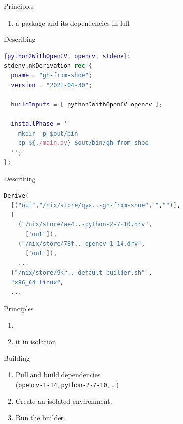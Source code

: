 \documentclass[aspectratio=169]{beamer}
\newcommand{\couleur}[2]{{\color{#1}{#2}}}
\begin{document}
\begin{frame}
    \begin{block}{Principles}
        \begin{enumerate}
            \item<2-> \couleur{blue-portage}{Describe} a package and its
                dependencies in full
         \end{enumerate}
    \end{block}
\end{frame}

\begin{frame}[fragile]{Describing}
\begin{lstlisting}[language=Nix,title={gh-from-shoe/default.nix}]
{python2WithOpenCV, opencv, stdenv}:
stdenv.mkDerivation rec {
  pname = "gh-from-shoe";
  version = "2021-04-30";

  buildInputs = [ python2WithOpenCV opencv ];

  installPhase = ''
    mkdir -p $out/bin
    cp ${./main.py} $out/bin/gh-from-shoe
  '';
};
\end{lstlisting}
\end{frame}

\begin{frame}[fragile]{Describing}
\begin{lstlisting}[language=Nix,title={gh-from-shoe-1-0.drv (generated)}]
Derive(
  [("out","/nix/store/qya..-gh-from-shoe","","")],
  [
    ("/nix/store/ae4..-python-2-7-10.drv",
      ["out"]),
    ("/nix/store/78f..-opencv-1-14.drv",
      ["out"]),
    ...
  ["/nix/store/9kr..-default-builder.sh"],
  "x86_64-linux",
  ...
\end{lstlisting}
\end{frame}

\begin{frame}
    \begin{block}{Principles}
        \begin{enumerate}
            \item \couleur{dark-grey}{Describe a package and its
                dependencies in full}
            \item
                \couleur{blue-portage}{Build} it in isolation
        \end{enumerate}
    \end{block}
\end{frame}

\begin{frame}{Building}
    \couleur{green-pea}{gh-from-shoe-1.0\$}\ \couleur{blue-marguerite}{nix build}
    \begin{enumerate}
        \item Pull and build dependencies\\
            (\lstinline+opencv-1-14+, \lstinline+python-2-7-10+, \ldots)
        \item Create an isolated environment.
        \item Run the builder.
    \end{enumerate}
\end{frame}
\end{document}

